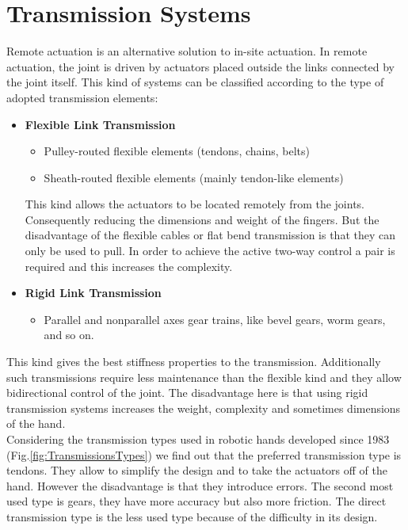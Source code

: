 \documentclass[a4paper, 10pt, conference]{ieeeconf}      %
\begin{document}
\section{\textbf{Transmission Systems}}
Remote actuation is an alternative solution to in-site actuation. In remote actuation, the joint is driven by actuators placed outside the links connected by the joint itself. This kind of systems can be classified according to the type of adopted transmission elements:\\
\begin{itemize}
\item \textbf{Flexible Link Transmission}
	\begin{itemize}
		\item Pulley-routed flexible elements (tendons, chains, belts)
		\item Sheath-routed flexible elements (mainly tendon-like elements)\\
	\end{itemize}
This kind allows the actuators to be located remotely from the joints. Consequently reducing the dimensions and weight of the fingers. But the disadvantage of the flexible cables or flat bend transmission is that they can only be used to pull. In order to achieve the active two-way control a pair is required and this increases the complexity.\\ 
\item \textbf{Rigid Link Transmission}
	\begin{itemize}
		\item Parallel and nonparallel axes gear trains, like bevel gears, worm gears, and so on.\\
	\end{itemize}
\end{itemize}
This kind gives the best stiffness properties to the transmission. Additionally such transmissions require less maintenance than the flexible kind and they allow bidirectional control of the joint. The disadvantage here is that using rigid transmission systems increases the weight, complexity and sometimes dimensions of the hand.\\
Considering the transmission types used in robotic hands developed since 1983 (Fig.\ref{fig:TransmissionsTypes}) we find out that the preferred transmission type is tendons. They allow to simplify the design and to take the actuators off of the hand. However the disadvantage is that they introduce errors. The second most used type is gears, they have more accuracy but also more friction. The direct transmission type is the less used type because of the difficulty in its design.\\
\end{document}
